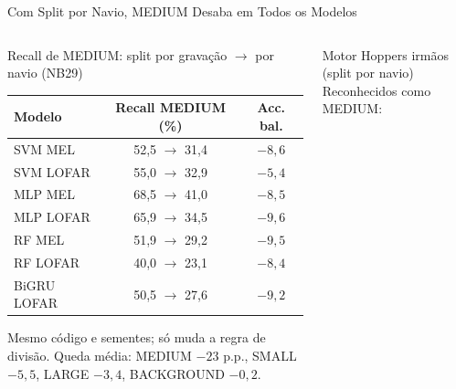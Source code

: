 \documentclass[aspectratio=169]{beamer}
\newcommand{\calo}[1]{\cellcolor{red!20}#1}
\begin{document}
\begin{frame}{Com Split por Navio, MEDIUM Desaba em Todos os Modelos}
    \footnotesize
    \begin{columns}[t]
        \begin{block}{\small Recall de MEDIUM: split por gravação $\to$ por navio (NB29)}
            \scriptsize
            \centering
            \begin{tabular}{lcc}
            \toprule
            Modelo & Recall MEDIUM (\%) & Acc. bal. \\
            \midrule
            SVM MEL & 52,5 $\to$ \calo{31,4} & $-8{,}6$ \\
            SVM LOFAR & 55,0 $\to$ \calo{32,9} & $-5{,}4$ \\
            MLP MEL & 68,5 $\to$ \calo{41,0} & $-8{,}5$ \\
            MLP LOFAR & 65,9 $\to$ \calo{34,5} & $-9{,}6$ \\
            RF MEL & 51,9 $\to$ \calo{29,2} & $-9{,}5$ \\
            RF LOFAR & 40,0 $\to$ \calo{23,1} & $-8{,}4$ \\
            BiGRU LOFAR & 50,5 $\to$ \calo{27,6} & $-9{,}2$ \\
            \bottomrule
            \end{tabular}

            \vspace{0.05cm}
            {\tiny Mesmo código e sementes; só muda a regra de divisão. Queda média: MEDIUM $-23$ p.p., SMALL $-5{,}5$, LARGE $-3{,}4$, BACKGROUND $-0{,}2$.\par}
        \end{block}
        \begin{block}{\small Motor Hoppers irmãos (split por navio)}
            \scriptsize
            \centering
            Reconhecidos como MEDIUM:


\end{block}
\end{columns}
\end{frame}
\end{document}
